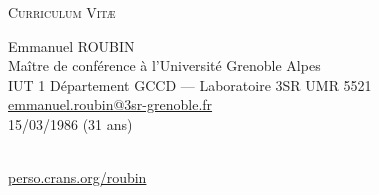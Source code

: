 \documentclass[a4paper,11pt]{article}
\begin{document}
\begin{center} \par\textsc{\huge Curriculum Vit\ae} \end{center}
\begin{minipage}{0.7\linewidth}
  \begin{flushleft}
    \LARGE Emmanuel ROUBIN \normalsize  \vspace{0.1cm} \\
    \large Maître de conférence à l'Université Grenoble Alpes \normalsize\\\vspace{0.2cm}
    IUT 1 Département GCCD --- Laboratoire 3SR UMR 5521\\
    \href{mailto:emmanuel.roubin@3sr-grenoble.fr}{emmanuel.roubin@3sr-grenoble.fr}\\\vspace{0.2cm}
    15/03/1986 (31 ans)
  \end{flushleft}
\end{minipage}
\hfill
\begin{minipage}{4cm}
  \centering
   \\ \vspace{0.1cm}
  \footnotesize\href{http://perso.crans.org/roubin}{perso.crans.org/roubin}
\end{minipage}
\vfill
\end{document}
